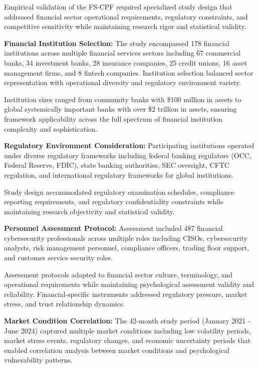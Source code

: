 \documentclass[10pt, twocolumn]{article}
\begin{document}
Empirical validation of the FS-CPF required specialized study design that addressed financial sector operational requirements, regulatory constraints, and competitive sensitivity while maintaining research rigor and statistical validity.

\textbf{Financial Institution Selection:} The study encompassed 178 financial institutions across multiple financial services sectors including 67 commercial banks, 34 investment banks, 28 insurance companies, 25 credit unions, 16 asset management firms, and 8 fintech companies. Institution selection balanced sector representation with operational diversity and regulatory environment variety.

Institution sizes ranged from community banks with \$100 million in assets to global systemically important banks with over \$2 trillion in assets, ensuring framework applicability across the full spectrum of financial institution complexity and sophistication.

\textbf{Regulatory Environment Consideration:} Participating institutions operated under diverse regulatory frameworks including federal banking regulators (OCC, Federal Reserve, FDIC), state banking authorities, SEC oversight, CFTC regulation, and international regulatory frameworks for global institutions.

Study design accommodated regulatory examination schedules, compliance reporting requirements, and regulatory confidentiality constraints while maintaining research objectivity and statistical validity.

\textbf{Personnel Assessment Protocol:} Assessment included 487 financial cybersecurity professionals across multiple roles including CISOs, cybersecurity analysts, risk management personnel, compliance officers, trading floor support, and customer service security roles.

Assessment protocols adapted to financial sector culture, terminology, and operational requirements while maintaining psychological assessment validity and reliability. Financial-specific instruments addressed regulatory pressure, market stress, and trust relationship dynamics.

\textbf{Market Condition Correlation:} The 42-month study period (January 2021 - June 2024) captured multiple market conditions including low volatility periods, market stress events, regulatory changes, and economic uncertainty periods that enabled correlation analysis between market conditions and psychological vulnerability patterns.
\end{document}
